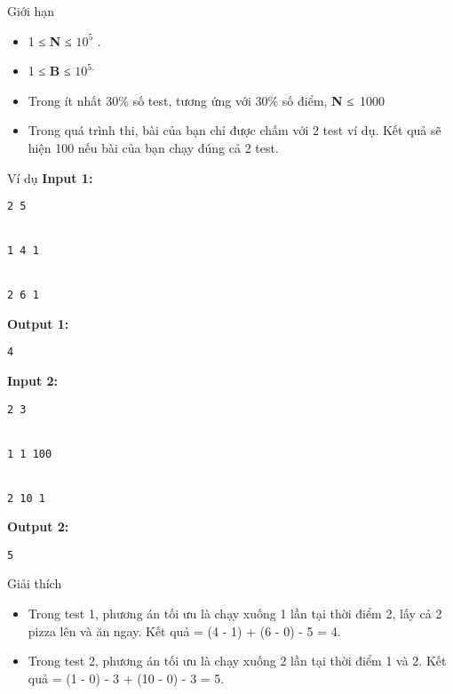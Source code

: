 Giới hạn
\begin{itemize}
	\item     1         ≤     \textbf{      N     }      ≤ $10^{5}$      .     
	\item     1 ≤    \textbf{     B    }    ≤ $10^{5.}$
	\item     Trong ít nhất 30\% số test, tương ứng với 30\% số điểm,    \textbf{     N    }    ≤ 1000   
	\item     Trong quá trình thi, bài của bạn chỉ được chấm với 2 test ví dụ. Kết quả sẽ hiện 100 nếu bài của bạn chạy đúng cả 2 test.   
\end{itemize}
Ví dụ
\textbf{    Input 1:   }
\begin{verbatim}
2 5


1 4 1


2 6 1\end{verbatim}

\textbf{    Output 1:   }
\begin{verbatim}
4\end{verbatim}

\textbf{    Input 2:   }
\begin{verbatim}
2 3


1 1 100


2 10 1\end{verbatim}

\textbf{    Output 2:   }
\begin{verbatim}
5\end{verbatim}
Giải thích
\begin{itemize}
	\item     Trong test 1, phương án tối ưu là chạy xuống 1 lần tại thời điểm 2, lấy cả 2 pizza lên và ăn ngay. Kết quả = (4 - 1) + (6 - 0) - 5 = 4.   
	\item     Trong test 2, phương án tối ưu là chạy xuống 2 lần tại thời điểm 1 và 2. Kết quả = (1 - 0) - 3 + (10 - 0) - 3 = 5.   
\end{itemize}